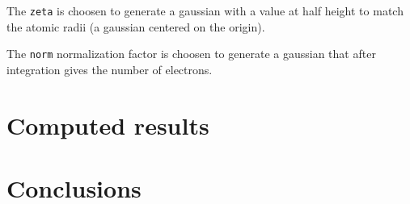 \documentclass[a4paper,12pt]{article}
\begin{document}
The \verb|zeta| is choosen to generate a gaussian with a value at half height
to match the atomic radii (a gaussian centered on the origin).

The \verb|norm| normalization factor is choosen to generate a gaussian
that after integration gives the number of electrons.

\section{Computed results}

\section{Conclusions}


\begin{thebibliography}{1}

\end{thebibliography}
\end{document}
